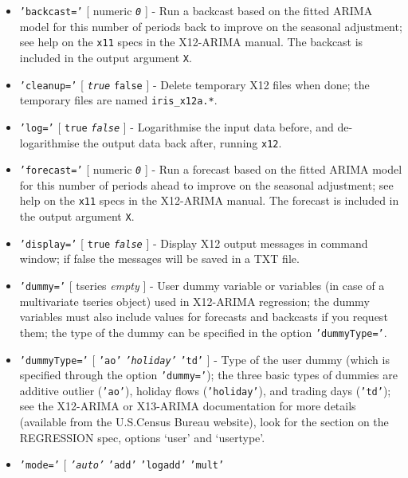 \begin{itemize}
\item
  \texttt{'backcast='} {[} numeric \textbar{} \emph{\texttt{0}} {]} -
  Run a backcast based on the fitted ARIMA model for this number of
  periods back to improve on the seasonal adjustment; see help on the
  \texttt{x11} specs in the X12-ARIMA manual. The backcast is included
  in the output argument \texttt{X}.
\item
  \texttt{'cleanup='} {[} \emph{\texttt{true}} \textbar{} \texttt{false}
  {]} - Delete temporary X12 files when done; the temporary files are
  named \texttt{iris\_x12a.*}.
\item
  \texttt{'log='} {[} \texttt{true} \textbar{} \emph{\texttt{false}} {]}
  - Logarithmise the input data before, and de-logarithmise the output
  data back after, running \texttt{x12}.
\item
  \texttt{'forecast='} {[} numeric \textbar{} \emph{\texttt{0}} {]} -
  Run a forecast based on the fitted ARIMA model for this number of
  periods ahead to improve on the seasonal adjustment; see help on the
  \texttt{x11} specs in the X12-ARIMA manual. The forecast is included
  in the output argument \texttt{X}.
\item
  \texttt{'display='} {[} \texttt{true} \textbar{} \emph{\texttt{false}}
  {]} - Display X12 output messages in command window; if false the
  messages will be saved in a TXT file.
\item
  \texttt{'dummy='} {[} tseries \textbar{} \emph{empty} {]} - User dummy
  variable or variables (in case of a multivariate tseries object) used
  in X12-ARIMA regression; the dummy variables must also include values
  for forecasts and backcasts if you request them; the type of the dummy
  can be specified in the option \texttt{'dummyType='}.
\item
  \texttt{'dummyType='} {[} \texttt{'ao'} \textbar{}
  \emph{\texttt{'holiday'}} \textbar{} \texttt{'td'} {]} - Type of the
  user dummy (which is specified through the option \texttt{'dummy='});
  the three basic types of dummies are additive outlier (\texttt{'ao'}),
  holiday flows (\texttt{'holiday'}), and trading days (\texttt{'td'});
  see the X12-ARIMA or X13-ARIMA documentation for more details
  (available from the U.S.Census Bureau website), look for the section
  on the REGRESSION spec, options `user' and `usertype'.
\item
  \texttt{'mode='} {[} \emph{\texttt{'auto'}} \textbar{} \texttt{'add'}
  \textbar{} \texttt{'logadd'} \textbar{} \texttt{'mult'} \textbar{}

\end{itemize}
